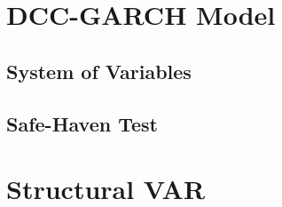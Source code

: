 

\section{DCC-GARCH Model}
\label{sec:method_dcc}


\subsection{System of Variables}
\label{sec:dcc_variables}


\subsection{Safe-Haven Test}
\label{sec:dcc_safehaven}



\section{Structural VAR}
\label{sec:method_svar}

